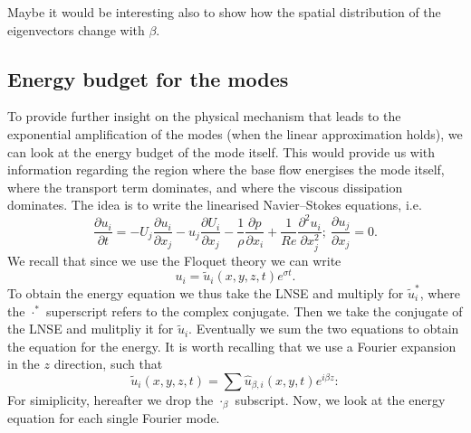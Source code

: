 \documentclass{jfm}
\begin{document}
Maybe it would be interesting also to show how the spatial distribution of the eigenvectors change with $\beta$.

\subsection{Energy budget for the modes}

To provide further insight on the physical mechanism that leads to the exponential amplification of the modes (when the linear approximation holds), we can look at the energy budget of the mode itself. This would provide us with information regarding the region where the base flow energises the mode itself, where the transport term dominates, and where the viscous dissipation dominates. The idea is to write the linearised Navier--Stokes equations, i.e.
%
\begin{equation}
  \frac{\partial u_i}{\partial t}  = - U_j \frac{\partial u_i}{\partial x_j} - u_j \frac{\partial U_i}{\partial x_j} - \frac{1}{\rho}\frac{\partial p}{\partial x_i} + \frac{1}{Re} \frac{\partial^2 u_i}{\partial x_j^2}; \ \frac{\partial u_j}{\partial x_j} = 0.
\end{equation}
We recall that since we use the Floquet theory we can write
%
\begin{equation}
  u_i = \tilde{u}_i(x,y,z,t) e^{\sigma t}.
\end{equation}
%
To obtain the energy equation we thus take the LNSE and multiply for $\tilde{u}_i^*$, where the $\cdot^*$ superscript refers to the complex conjugate. Then we take the conjugate of the LNSE and mulitpliy it for $\tilde{u}_i$. Eventually we sum the two equations to obtain the equation for the energy.
It is worth recalling that we use a Fourier expansion in the $z$ direction, such that
%
\begin{equation}
  \tilde{u}_i(x,y,z,t) = \sum \hat{u}_{\beta,i}(x,y,t) e^{i\beta z}:
\end{equation}
%
For simiplicity, hereafter we drop the $\cdot_\beta$ subscript.
Now, we look at the energy equation for each single Fourier mode.
\end{document}

